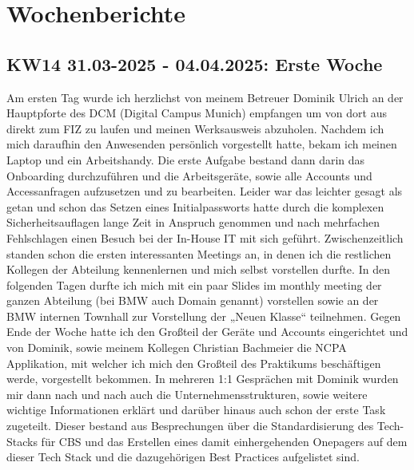 \section{Wochenberichte}
\subsection{KW14 31.03-2025 - 04.04.2025: Erste Woche}
Am ersten Tag wurde ich herzlichst von meinem Betreuer Dominik Ulrich an der Hauptpforte des \ac{DCM} (Digital Campus Munich) empfangen um von dort aus direkt zum \ac{FIZ} zu laufen und meinen Werksausweis abzuholen. 
Nachdem ich mich daraufhin den Anwesenden persönlich vorgestellt hatte, bekam ich meinen Laptop und ein Arbeitshandy. 
Die erste Aufgabe bestand dann darin das Onboarding durchzuführen und die Arbeitsgeräte, sowie alle Accounts und Accessanfragen aufzusetzen und zu bearbeiten. 
Leider war das leichter gesagt als getan und schon das Setzen eines Initialpassworts hatte durch die komplexen Sicherheitsauflagen lange Zeit in Anspruch genommen und nach mehrfachen Fehlschlagen einen Besuch bei der In-House IT mit sich geführt. 
Zwischenzeitlich standen schon die ersten interessanten Meetings an, in denen ich die restlichen Kollegen der Abteilung kennenlernen und mich selbst vorstellen durfte. 
In den folgenden Tagen durfte ich mich mit ein paar Slides im monthly meeting der ganzen Abteilung (bei BMW auch Domain genannt) vorstellen sowie an der BMW internen Townhall zur Vorstellung der „Neuen Klasse“ teilnehmen. 
Gegen Ende der Woche hatte ich den Großteil der Geräte und Accounts eingerichtet und von Dominik, sowie meinem Kollegen Christian Bachmeier die \ac{NCPA} Applikation, mit welcher ich mich den Großteil des Praktikums beschäftigen werde, vorgestellt bekommen. 
In mehreren 1:1 Gesprächen mit Dominik wurden mir dann nach und nach auch die Unternehmensstrukturen, sowie weitere wichtige Informationen erklärt und darüber hinaus auch schon der erste Task zugeteilt. 
Dieser bestand aus Besprechungen über die Standardisierung des Tech-Stacks für \ac{CBS} und das Erstellen eines damit einhergehenden Onepagers auf dem dieser Tech Stack und die dazugehörigen Best Practices aufgelistet sind.


